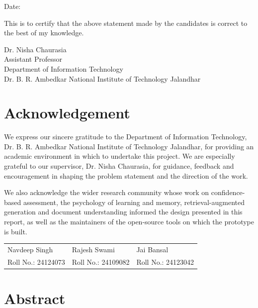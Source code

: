 \documentclass[12pt,a4paper,oneside]{report}
\begin{document}
\vspace{1.5cm}
\noindent Date: \hrulefill\hspace*{8cm}

\vspace{1.5cm}
\noindent This is to certify that the above statement made by the candidates
is correct to the best of my knowledge.

\vspace{2cm}
\begin{flushright}
Dr. Nisha Chaurasia\\
Assistant Professor\\
Department of Information Technology\\
Dr. B. R. Ambedkar National Institute of Technology Jalandhar
\end{flushright}

\clearpage

\chapter*{Acknowledgement}

We express our sincere gratitude to the Department of
Information Technology, Dr. B. R. Ambedkar National Institute of
Technology Jalandhar, for providing an academic environment in which to
undertake this project. We are especially grateful to our supervisor,
Dr. Nisha Chaurasia, for guidance, feedback and encouragement
in shaping the problem statement and the direction of the work.

We also acknowledge the wider research community whose work on
confidence-based assessment, the psychology of learning and memory,
retrieval-augmented generation and document understanding informed the
design presented in this report, as well as the maintainers of the
open-source tools on which the prototype is built.

\vspace{1.5cm}
\noindent
\begin{tabular}{@{}p{5cm}p{5cm}p{5cm}@{}}
Navdeep Singh & Rajesh Swami & Jai Bansal\\
Roll No.: 24124073 & Roll No.: 24109082 & Roll No.: 24123042\\
\end{tabular}

\clearpage

\chapter*{Abstract}
\end{document}
